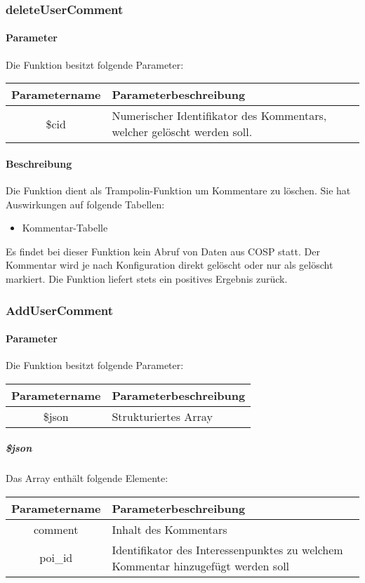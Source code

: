 \subsubsection{deleteUserComment}
\paragraph{Parameter} Die Funktion besitzt folgende Parameter:
\begin{table}[H]
	\begin{tabular}{|c|p{11cm}|}
		\hline
		\textbf{Parametername} & \textbf{Parameterbeschreibung} \\ \hline
		\$cid & Numerischer Identifikator des Kommentars, welcher gelöscht werden soll. \\ \hline
	\end{tabular}
\end{table}
\paragraph{Beschreibung} Die Funktion dient als Trampolin-Funktion um Kommentare zu löschen. Sie hat Auswirkungen auf folgende Tabellen:
\begin{itemize}
	\item Kommentar-Tabelle
\end{itemize}
Es findet bei dieser Funktion kein Abruf von Daten aus {\glqq COSP\grqq} statt. Der Kommentar wird je nach Konfiguration direkt gelöscht oder nur als gelöscht markiert. Die Funktion liefert stets ein positives Ergebnis zurück.
\subsubsection{AddUserComment}
\paragraph{Parameter} Die Funktion besitzt folgende Parameter:
\begin{table}[H]
	\begin{tabular}{|c|p{11cm}|}
		\hline
		\textbf{Parametername} & \textbf{Parameterbeschreibung} \\ \hline
		\$json & Strukturiertes Array  \\ \hline
	\end{tabular}
\end{table}
\subparagraph{\$json}Das Array enthält folgende Elemente:
\begin{table}[H]
	\begin{tabular}{|c|p{11cm}|}
		\hline
		\textbf{Parametername} & \textbf{Parameterbeschreibung} \\ \hline
		comment & Inhalt des Kommentars  \\ \hline
		poi\_id & Identifikator des Interessenpunktes zu welchem Kommentar hinzugefügt werden soll\\ \hline
	\end{tabular}
\end{table}
